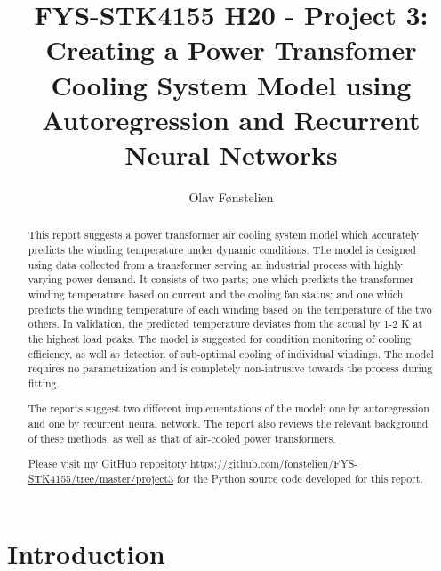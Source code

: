 \documentclass[]{article}
\title{FYS-STK4155 H20 - Project 3:\\Creating a Power Transfomer Cooling System Model using Autoregression and Recurrent Neural Networks}
\author{Olav Fønstelien}
\begin{document}
\maketitle

\begin{abstract}
This report suggests a power transformer air cooling system model which accurately predicts the winding temperature under dynamic conditions. The model is designed using data collected from a transformer serving an industrial process with highly varying power demand. It consists of two parts; one which predicts the transformer winding temperature based on current and the cooling fan status; and one which predicts the winding temperature of each winding based on the temperature of the two others. In validation, the predicted temperature deviates from the actual by 1-2 K at the highest load peaks. The model is suggested for condition monitoring of cooling efficiency, as well as detection of sub-optimal cooling of individual windings. The model requires no parametrization and is completely non-intrusive towards the process during fitting.

The reports suggest two different implementations of the model; one by autoregression and one by recurrent neural network. The report also reviews the relevant background of these methods, as well as that of air-cooled power transformers.

Please visit my GitHub repository \url{https://github.com/fonstelien/FYS-STK4155/tree/master/project3} for the Python source code developed for this report.
\end{abstract}

\section{Introduction} \label{sec:intro}
\end{document}

